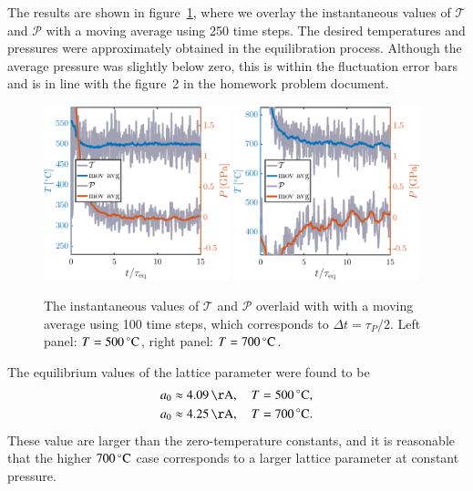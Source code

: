 The results are shown in figure~\ref{fig:eq}, where we overlay the instantaneous values of $\mathcal{T}$ and $\mathcal{P}$ with a moving average using 250 time steps. The desired temperatures and pressures were approximately obtained in the equilibration process. Although  the average pressure was slightly below zero, this is within the fluctuation error bars and is in line with the figure~2 in the homework problem document. 
\begin{figure}[!ht]
\begin{center}
  \includegraphics[width=0.48\textwidth]{../figures/TP-eq-500} 
    \includegraphics[width=0.48\textwidth]{../figures/TP-eq-700} 
  \caption{The instantaneous values of $\mathcal{T}$ and $\mathcal{P}$ overlaid with with a moving average using 100 time steps, which corresponds to $\Delta t = \tau_P/2$. Left panel: $T=\unit[500]{^\circ C}$,  right panel: $T=\unit[700]{^\circ C}$.}
  \label{fig:eq}
\end{center}
\end{figure}
The equilibrium values of the lattice parameter were found to be 
\begin{align}
a_0 &\approx \unit[4.09]{\AA}, \quad T=\unit[500]{^\circ C}, \\
a_0 &\approx \unit[4.25]{\AA}, \quad T=\unit[700]{^\circ C} .
\end{align} 
These value are larger than the zero-temperature constants, and it is reasonable that the higher $\unit[700]{^\circ C}$ case corresponds to a larger lattice parameter at constant pressure. 


